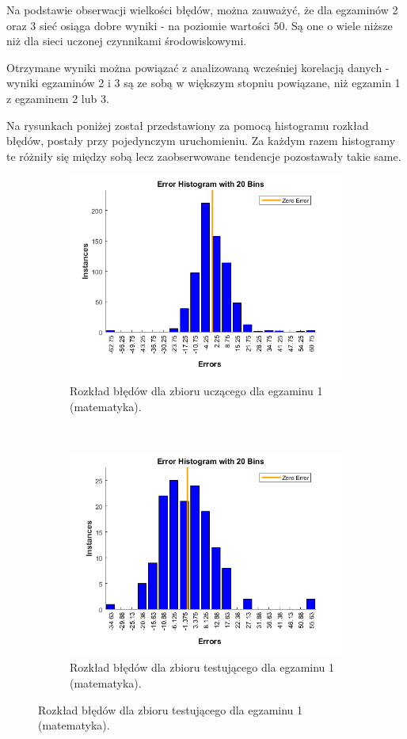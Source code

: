 \documentclass[12pt]{article}
\begin{document}
Na podstawie obserwacji wielkości błędów, można zauważyć, że dla egzaminów 2 oraz 3 sieć osiąga dobre wyniki - na poziomie wartości $50$.  Są one o wiele niższe niż dla sieci uczonej czynnikami środowiskowymi.

Otrzymane wyniki można powiązać z analizowaną wcześniej korelacją danych - wyniki egzaminów 2 i 3 są ze sobą w większym stopniu powiązane, niż egzamin 1 z egzaminem 2 lub 3.

Na rysunkach poniżej został przedstawiony za pomocą histogramu rozkład błędów, postały przy pojedynczym uruchomieniu. Za każdym razem histogramy te różniły się między sobą lecz zaobserwowane tendencje pozostawały takie same.

\begin{figure}[H]
\centering
\begin{subfigure}[t]{0.48\textwidth} 
\centering
\includegraphics[width=\textwidth]{hist_exam_1_learn.png}
\caption{Rozkład błędów dla zbioru uczącego dla egzaminu 1 (matematyka).}
\end{subfigure}
~~
\begin{subfigure}[t]{0.48\textwidth} 
\centering
\includegraphics[width=\textwidth]{hist_exam_1_test.png}
\caption{Rozkład błędów dla zbioru testującego dla egzaminu 1 (matematyka).}
\end{subfigure}


\end{figure}
\end{document}
